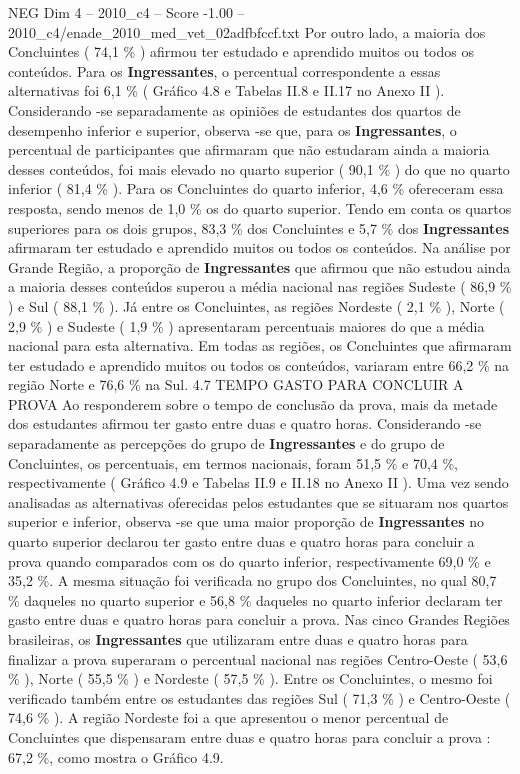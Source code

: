 \begin{textsample}{NEG Dim 4 – 2010\_c4 – Score -1.00 – 2010\_c4/enade\_2010\_med\_vet\_02adfbfccf.txt}
Por outro lado, a maioria dos Concluintes ( 74,1 \% ) afirmou ter estudado e aprendido muitos ou todos os conteúdos.
Para os \textbf{Ingressantes}, o percentual correspondente a essas alternativas foi 6,1 \% ( Gráfico 4.8 e Tabelas II.8 e II.17 no Anexo II ).
Considerando -se separadamente as opiniões de estudantes dos quartos de desempenho inferior e superior, observa -se que, para os \textbf{Ingressantes}, o percentual de participantes que afirmaram que não estudaram ainda a maioria desses conteúdos, foi mais elevado no quarto superior ( 90,1 \% ) do que no quarto inferior ( 81,4 \% ).
Para os Concluintes do quarto inferior, 4,6 \% ofereceram essa resposta, sendo menos de 1,0 \% os do quarto superior.
Tendo em conta os quartos superiores para os dois grupos, 83,3 \% dos Concluintes e 5,7 \% dos \textbf{Ingressantes} afirmaram ter estudado e aprendido muitos ou todos os conteúdos.
Na análise por Grande Região, a proporção de \textbf{Ingressantes} que afirmou que não estudou ainda a maioria desses conteúdos superou a média nacional nas regiões Sudeste ( 86,9 \% ) e Sul ( 88,1 \% ).
Já entre os Concluintes, as regiões Nordeste ( 2,1 \% ), Norte ( 2,9 \% ) e Sudeste ( 1,9 \% ) apresentaram percentuais maiores do que a média nacional para esta alternativa.
Em todas as regiões, os Concluintes que afirmaram ter estudado e aprendido muitos ou todos os conteúdos, variaram entre 66,2 \% na região Norte e 76,6 \% na Sul. 4.7 TEMPO GASTO PARA CONCLUIR A PROVA Ao responderem sobre o tempo de conclusão da prova, mais da metade dos estudantes afirmou ter gasto entre duas e quatro horas.
Considerando -se separadamente as percepções do grupo de \textbf{Ingressantes} e do grupo de Concluintes, os percentuais, em termos nacionais, foram 51,5 \% e 70,4 \%, respectivamente ( Gráfico 4.9 e Tabelas II.9 e II.18 no Anexo II ).
Uma vez sendo analisadas as alternativas oferecidas pelos estudantes que se situaram nos quartos superior e inferior, observa -se que uma maior proporção de \textbf{Ingressantes} no quarto superior declarou ter gasto entre duas e quatro horas para concluir a prova quando comparados com os do quarto inferior, respectivamente 69,0 \% e 35,2 \%.
A mesma situação foi verificada no grupo dos Concluintes, no qual 80,7 \% daqueles no quarto superior e 56,8 \% daqueles no quarto inferior declaram ter gasto entre duas e quatro horas para concluir a prova.
Nas cinco Grandes Regiões brasileiras, os \textbf{Ingressantes} que utilizaram entre duas e quatro horas para finalizar a prova superaram o percentual nacional nas regiões Centro-Oeste ( 53,6 \% ), Norte ( 55,5 \% ) e Nordeste ( 57,5 \% ).
Entre os Concluintes, o mesmo foi verificado também entre os estudantes das regiões Sul ( 71,3 \% ) e Centro-Oeste ( 74,6 \% ).
A região Nordeste foi a que apresentou o menor percentual de Concluintes que dispensaram entre duas e quatro horas para concluir a prova : 67,2 \%, como mostra o Gráfico 4.9.

\end{textsample}
